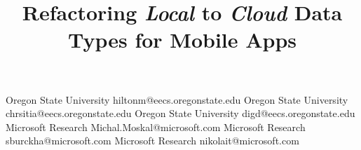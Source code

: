 \documentclass[preprint]{sigplanconf}
\begin{document}
\thispagestyle{empty}


\setlength{\pdfpageheight}{\paperheight}
\setlength{\pdfpagewidth}{\paperwidth}






\title{Refactoring \emph{Local} to \emph{Cloud} Data Types for Mobile Apps}

           {Oregon State University}
           {hiltonm@eecs.oregonstate.edu}
           {Oregon State University}
           {chrsitia@eecs.oregonstate.edu}
           {Oregon State University}
           {digd@eecs.oregonstate.edu}
           {Microsoft Research}
           {Michal.Moskal@microsoft.com}
           {Microsoft Research}
           {sburckha@microsoft.com}
           {Microsoft Research}
           {nikolait@microsoft.com}
\maketitle
\end{document}
